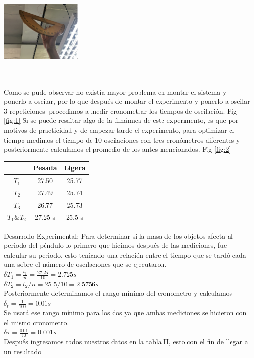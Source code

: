 \documentclass[10pt]{article}
\begin{document}
\begin{multicols}{2}
\begin{center}
	\includegraphics[width=4cm,height=5cm]{Imagenes/regla.png}
	\label{fig:2}
\end{center}
Como se pudo observar no existía mayor problema en montar el sistema y ponerlo a oscilar, por lo que después de montar el experimento y ponerlo a oscilar 3 repeticiones, procedimos a medir cronometrar los tiempos de oscilación. Fig \ref{fig:1}
Si se puede resaltar algo de la dinámica de este experimento, es que por motivos de practicidad y de empezar tarde el experimento, para optimizar el tiempo medimos el tiempo de 10 oscilaciones con tres cronómetros diferentes y posteriormente calculamos el promedio de los antes mencionados. Fig \ref{fig:2}


\begin{center}
	\begin{adjustbox}{width=154pt}
		\begin{tabular}{|c|c|c|}
			\hline
			&Pesada &Ligera \\
			\hline
			$T_{1}$ &27.50&	25.77\\
			\hline
			$T_{2}$ &27.49&	25.74 \\
			\hline
			$T_{3}$ &26.77&	25.73 \\
			\hline
			$T_{1} \& T_{2}$ &27.25 s	&25.5 s\\
			\hline
		\end{tabular}
	\end{adjustbox}
\end{center}

Desarrollo Experimental:
Para determinar si la masa de los objetos afecta al periodo del péndulo lo primero que hicimos después de las mediciones, fue calcular su periodo, esto teniendo una relación entre el tiempo que se tardó cada una sobre el número de oscilaciones que se ejecutaron. \\
$\delta T_{1}=\frac{t_{1}}{n}=\frac{27.25}{10}=2.725 s$ \\ 
$\delta T_{2}=t_2/n=25.5/10=2.5756 s$ \\
Posteriormente determinamos el rango mínimo del cronometro y calculamos \\
$\delta_{t}=\frac{1}{100}=0.01 s$ \\
Se usará ese rango mínimo para los dos ya que ambas mediciones se hicieron con el mismo cronometro. \\
$\delta \tau=\frac{0.01}{10}=0.001s$\\
Después ingresamos todos nuestros datos en la tabla II, esto con el fin de llegar a un resultado


\end{multicols}
\end{document}
